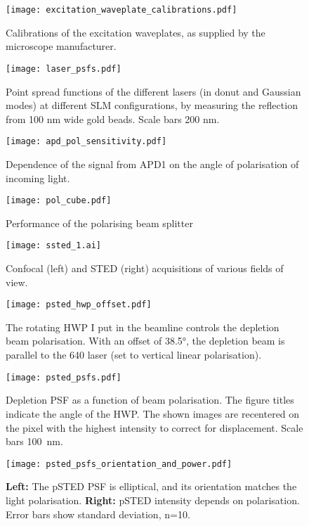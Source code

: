 \begin{figure}
	\centering
	\texttt{[image: excitation\_waveplate\_calibrations.pdf]}
	\caption{
		Calibrations of the excitation waveplates, as supplied by the microscope manufacturer.
	}
	\label{fig:excitation waveplate calibration}
\end{figure}

\begin{figure}
	\centering
	\texttt{[image: laser\_psfs.pdf]}
	\caption{
		Point spread functions of the different lasers (in donut and Gaussian modes) at different SLM configurations, by measuring the reflection from 100 nm wide gold beads. Scale bars 200 nm.
	}
	\label{fig:normal psfs}
\end{figure}

\begin{figure}
	\centering
	\texttt{[image: apd\_pol\_sensitivity.pdf]}
	\caption{Dependence of the signal from APD1 on the angle of polarisation of incoming light.}
	\label{fig:apd pol sensitivity}
\end{figure}

\begin{figure}
\centering
\texttt{[image: pol\_cube.pdf]}
\caption{Performance of the polarising beam splitter}
\label{fig:pol cube}
\end{figure}

\begin{figure}
	\centering
	\texttt{[image: ssted\_1.ai]}
	\caption{
		Confocal (left) and STED (right) acquisitions of various fields of view.
	}
	\label{fig:ssted supplementary}
\end{figure}


\begin{figure}
	\centering
	\texttt{[image: psted\_hwp\_offset.pdf]}
	\caption{
		The rotating HWP I put in the beamline controls the depletion beam polarisation. With an offset of 38.5°, the depletion beam is parallel to the 640 laser (set to vertical linear polarisation).
	}
	\label{fig:psted hwp offset}
\end{figure}

\begin{figure}
	\centering
	\texttt{[image: psted\_psfs.pdf]}
	\caption{
		Depletion PSF as a function of beam polarisation. The figure titles indicate the angle of the HWP. The shown images are recentered on the pixel with the highest intensity to correct for displacement. Scale bars 100~nm.
	}
	\label{fig:psted psfs}
\end{figure}

\begin{figure}
	\centering
	\texttt{[image: psted\_psfs\_orientation\_and\_power.pdf]}
	\caption{
		\textbf{Left:} The pSTED PSF is elliptical, and its orientation matches the light polarisation. \textbf{Right:} pSTED intensity depends on polarisation. Error bars show standard deviation, n=10.
	}
	\label{fig:psted psf orientation and power}
\end{figure}


